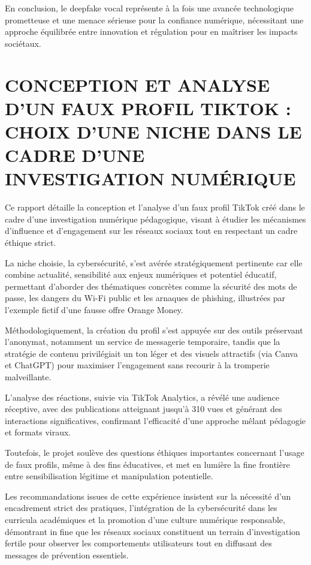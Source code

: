 \documentclass[12pt,a4paper]{article}
\begin{document}
En conclusion, le deepfake vocal représente à la fois une avancée technologique prometteuse et une menace sérieuse pour la confiance numérique, nécessitant une approche équilibrée entre innovation et régulation pour en maîtriser les impacts sociétaux.

\section{CONCEPTION ET ANALYSE D'UN FAUX PROFIL TIKTOK : CHOIX D'UNE NICHE DANS LE CADRE D'UNE INVESTIGATION NUMÉRIQUE}

Ce rapport détaille la conception et l'analyse d'un faux profil TikTok créé dans le cadre d'une investigation numérique pédagogique, visant à étudier les mécanismes d'influence et d'engagement sur les réseaux sociaux tout en respectant un cadre éthique strict. 

La niche choisie, la cybersécurité, s'est avérée stratégiquement pertinente car elle combine actualité, sensibilité aux enjeux numériques et potentiel éducatif, permettant d'aborder des thématiques concrètes comme la sécurité des mots de passe, les dangers du Wi-Fi public et les arnaques de phishing, illustrées par l'exemple fictif d'une fausse offre Orange Money. 

Méthodologiquement, la création du profil s'est appuyée sur des outils préservant l'anonymat, notamment un service de messagerie temporaire, tandis que la stratégie de contenu privilégiait un ton léger et des visuels attractifs (via Canva et ChatGPT) pour maximiser l'engagement sans recourir à la tromperie malveillante. 

L'analyse des réactions, suivie via TikTok Analytics, a révélé une audience réceptive, avec des publications atteignant jusqu'à 310 vues et générant des interactions significatives, confirmant l'efficacité d'une approche mêlant pédagogie et formats viraux. 

Toutefois, le projet soulève des questions éthiques importantes concernant l'usage de faux profils, même à des fins éducatives, et met en lumière la fine frontière entre sensibilisation légitime et manipulation potentielle. 

Les recommandations issues de cette expérience insistent sur la nécessité d'un encadrement strict des pratiques, l'intégration de la cybersécurité dans les curricula académiques et la promotion d'une culture numérique responsable, démontrant in fine que les réseaux sociaux constituent un terrain d'investigation fertile pour observer les comportements utilisateurs tout en diffusant des messages de prévention essentiels.
\end{document}

